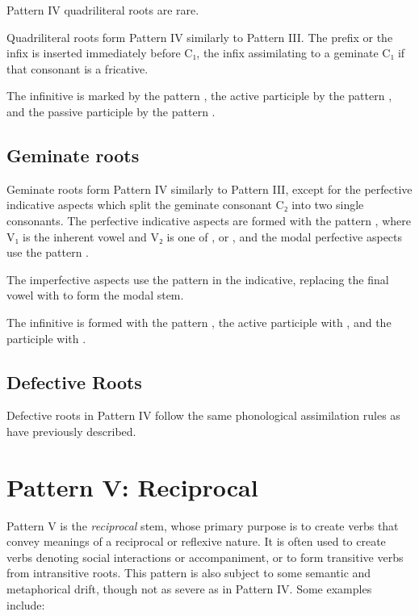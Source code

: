 \documentclass[grammar]{subfiles}
\begin{document}
Pattern IV quadriliteral roots are rare. 

Quadriliteral roots form Pattern IV similarly to Pattern III. The prefix
 or the infix  is inserted immediately before C₁, the infix
assimilating to a geminate C₁ if that consonant is a fricative. 

The infinitive is marked by the pattern , the active participle
by the pattern , and the passive participle by the pattern
.


\subsection{Geminate roots}
\label{ssec:vm_iv_geminate_roots}

Geminate roots form Pattern IV similarly to Pattern III, except for the
perfective indicative aspects which split the geminate consonant C₂ into two
single consonants.   The perfective indicative aspects are formed with the
pattern , where V₁ is the inherent vowel and V₂ is one of
,  or , and the modal perfective aspects use the pattern
.  

The imperfective aspects use the pattern  in the indicative,
replacing the final vowel with  to form the modal stem. 

The infinitive is formed with the pattern , the active participle
with , and the participle with .  



\subsection{Defective Roots}
\label{ssec:vm_iv_defective_roots}

Defective roots in Pattern IV follow the same phonological assimilation rules
as have previously described. 


\clearpage
\section{Pattern V: Reciprocal}
\label{sec:vm_pattern_v}

Pattern V is the \emph{reciprocal} stem, whose primary purpose is to create verbs that
convey meanings of a reciprocal or reflexive nature.  It is often used to
create verbs denoting social interactions or accompaniment, or to form
transitive verbs from intransitive roots.  This pattern is also subject to some
semantic and metaphorical drift, though not as severe as in Pattern IV. Some examples include:
\end{document}

